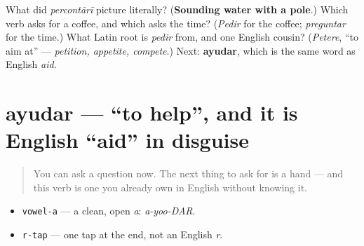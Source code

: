 \begin{tcolorbox}[breakable,colback=teal!4,colframe=teal!35!black,title={Before you move on}]
What did \emph{percontārī} picture literally? (\textbf{Sounding water with a pole}.) Which verb asks for a coffee, and which asks the time? (\emph{Pedir} for the coffee; \emph{preguntar} for the time.) What Latin root is \emph{pedir} from, and one English cousin? (\emph{Petere}, \textquotedblleft{}to aim at\textquotedblright{} — \emph{petition, appetite, compete}.) Next: \textbf{ayudar}, which is the same word as English \emph{aid}.
\end{tcolorbox}
\section[ayudar]{ayudar — \textquotedblleft{}to help\textquotedblright{}, and it is English \textquotedblleft{}aid\textquotedblright{} in disguise}

\label{lesson:ES-C35-ayudar}



\begin{quote}
You can ask a question now. The next thing to ask for is a hand — and this verb is one you already own in English without knowing it.
\end{quote}

\begin{sounds}
\begin{itemize}
\raggedright
  \item \texttt{vowel-a} — a clean, open \emph{a}: \emph{a-yoo-DAR}.
  \item \texttt{r-tap} — one tap at the end, not an English \emph{r}.
\end{itemize}
\end{sounds}

